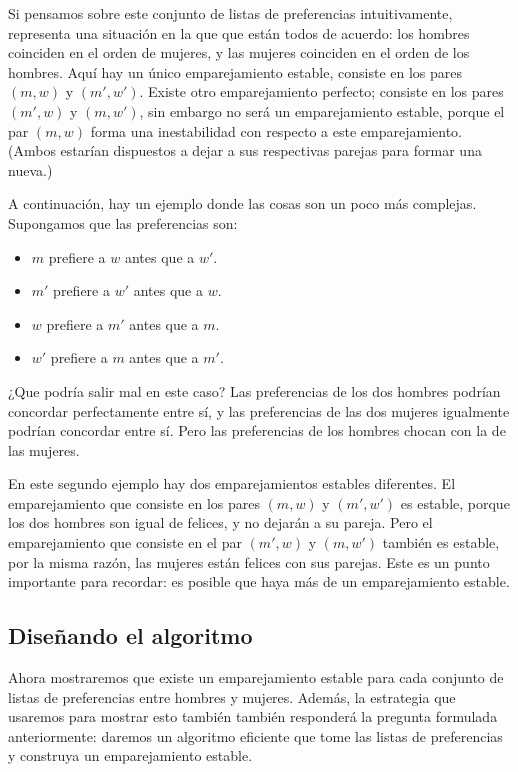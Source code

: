 \documentclass[a4paper, 12pt]{book}
\theoremstyle{dotless}
\begin{document}
Si pensamos sobre este conjunto de listas de preferencias intuitivamente, representa una situación en la que que están todos de acuerdo: los hombres coinciden en el orden de mujeres, y las mujeres coinciden en el orden de los hombres. Aquí hay un único emparejamiento estable, consiste en los pares $(m,w)$ y $(m',w')$. Existe otro emparejamiento perfecto; consiste en los pares $(m',w)$ y $(m,w')$, sin embargo no será un emparejamiento estable, porque el par $(m,w)$ forma una inestabilidad con respecto a este  emparejamiento. (Ambos estarían dispuestos a dejar a sus respectivas parejas para formar una nueva.)

A continuación, hay un ejemplo donde las cosas son un poco más complejas. Supongamos que las preferencias son:

   \begin{itemize}
      \item $m$ prefiere a $w$ antes que a $w'$.
      \item $m'$ prefiere a $w'$ antes que a $w$.
      \item $w$ prefiere a $m'$ antes que a $m$.
      \item $w'$ prefiere a $m$ antes que a $m'$.
    \end{itemize}
    
¿Que podría salir mal en este caso? Las preferencias de los dos hombres podrían concordar perfectamente entre sí, y las preferencias de las dos mujeres igualmente podrían concordar entre sí. Pero las preferencias de los hombres chocan con la de las mujeres. 

En este segundo ejemplo hay dos emparejamientos estables diferentes. El emparejamiento que consiste en los pares $(m, w)$ y $(m',w')$ es estable, porque los dos hombres son igual de felices, y no dejarán a su pareja. Pero el emparejamiento que consiste en el par $(m',w)$ y $(m,w')$ también es estable, por la misma razón, las mujeres están felices con sus parejas. Este es un punto importante para recordar: es posible que haya más de un emparejamiento estable.

\subsection*{Diseñando el algoritmo}

Ahora mostraremos que existe un emparejamiento estable para cada conjunto de listas de preferencias entre hombres y mujeres. Además, la estrategia que usaremos para mostrar esto también también responderá la pregunta formulada anteriormente: daremos un algoritmo eficiente que tome las listas de preferencias y construya un emparejamiento estable.  
\end{document}
